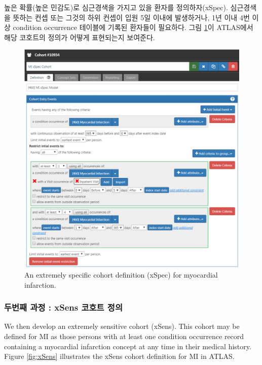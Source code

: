 \documentclass[11pt]{book}
\theoremstyle{definition}
\theoremstyle{definition}
\theoremstyle{definition}
\theoremstyle{remark}
\begin{document}
높은 확률(높은 민감도)로 심근경색을 가지고 있을 환자를 정의하자(xSpec).
심근경색을 뜻하는 컨셉 또는 그것의 하위 컨셉이 입원 5일 이내에
발생하거나, 1년 이내 4번 이상 condition occurrence 테이블에 기록된
환자들이 필요하다. 그림 \ref{fig:xSpec}이 ATLAS에서 해당 코호트의 정의가
어떻게 표현되는지 보여준다. 

\begin{figure}

{\centering \includegraphics[width=1\linewidth]{images/ClinicalValidity/xSpec} 

}

\caption{An extremely specific cohort definition (xSpec) for myocardial infarction.}\label{fig:xSpec}
\end{figure}

\subsubsection*{두번째 과정 : xSens 코호트 정의}\label{--xsens--}

We then develop an extremely sensitive cohort (xSens). This cohort may
be defined for MI as those persons with at least one condition
occurrence record containing a myocardial infarction concept at any time
in their medical history. Figure \ref{fig:xSens} illustrates the xSens
cohort definition for MI in ATLAS. 
\end{document}
